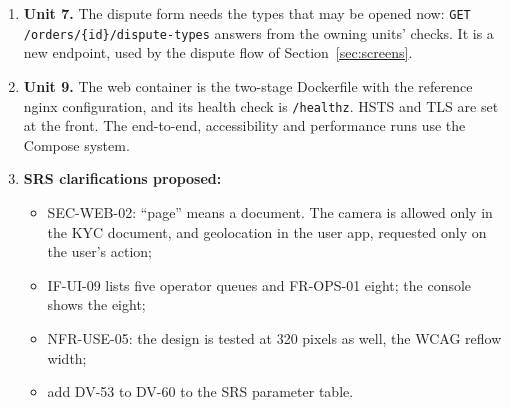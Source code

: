 \documentclass[11pt,a4paper]{article}
\begin{document}
\begin{enumerate}[label=\textbf{I-\arabic*}, leftmargin=*, nosep]
  \item \textbf{Unit 7.} The dispute form needs the types that may be opened now: \texttt{GET /orders/\allowbreak \{id\}/\allowbreak dispute-types} answers from the owning units' checks. It is a new endpoint, used by the dispute flow of Section~\ref{sec:screens}.
  \item \textbf{Unit 9.} The web container is the two-stage Dockerfile with the reference nginx configuration, and its health check is \texttt{/healthz}. HSTS and TLS are set at the front. The end-to-end, accessibility and performance runs use the Compose system.
  \item \textbf{SRS clarifications proposed:}
  \begin{itemize}[nosep]
    \item SEC-WEB-02: ``page'' means a document. The camera is allowed only in the KYC document, and geolocation in the user app, requested only on the user's action;
    \item IF-UI-09 lists five operator queues and FR-OPS-01 eight; the console shows the eight;
    \item NFR-USE-05: the design is tested at 320 pixels as well, the WCAG reflow width;
    \item add DV-53 to DV-60 to the SRS parameter table.
  \end{itemize}
\end{enumerate}

\appendix
\end{document}
